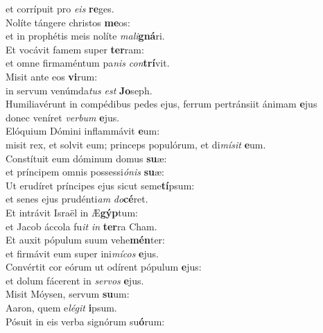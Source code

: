 \evenverse et corrípuit pro \textit{e}\textit{is} \textbf{re}ges.\\
\oddverse Nolíte tángere christos \textbf{me}os:~\*\\
\oddverse et in prophétis meis nolíte \textit{ma}\textit{li}\textbf{gná}ri.\\
\evenverse Et vocávit famem super \textbf{ter}ram:~\*\\
\evenverse et omne firmaméntum pa\textit{nis} \textit{con}\textbf{trí}vit.\\
\oddverse Misit ante eos \textbf{vi}rum:~\*\\
\oddverse in servum venúmda\textit{tus} \textit{est} \textbf{Jo}seph.\\
\evenverse Humiliavérunt in compédibus pedes ejus, ferrum pertránsiit ánimam \textbf{e}jus~\*\\
\evenverse donec veníret \textit{ver}\textit{bum} \textbf{e}jus.\\
\oddverse Elóquium Dómini inflammávit \textbf{e}um:~\*\\
\oddverse misit rex, et solvit eum; princeps populórum, et di\textit{mí}\textit{sit} \textbf{e}um.\\
\evenverse Constítuit eum dóminum domus \textbf{su}æ:~\*\\
\evenverse et príncipem omnis possessi\textit{ó}\textit{nis} \textbf{su}æ:\\
\oddverse Ut erudíret príncipes ejus sicut seme\textbf{tí}psum:~\*\\
\oddverse et senes ejus prudénti\textit{am} \textit{do}\textbf{cé}ret.\\
\evenverse Et intrávit Israël in Æ\textbf{gýp}tum:~\*\\
\evenverse et Jacob áccola fu\textit{it} \textit{in} \textbf{ter}ra Cham.\\
\oddverse Et auxit pópulum suum vehe\textbf{mén}ter:~\*\\
\oddverse et firmávit eum super ini\textit{mí}\textit{cos} \textbf{e}jus.\\
\evenverse Convértit cor eórum ut odírent pópulum \textbf{e}jus:~\*\\
\evenverse et dolum fácerent in \textit{ser}\textit{vos} \textbf{e}jus.\\
\oddverse Misit Móysen, servum \textbf{su}um:~\*\\
\oddverse Aaron, quem e\textit{lé}\textit{git} \textbf{i}psum.\\
\evenverse Pósuit in eis verba signórum su\textbf{ó}rum:~\*\\
